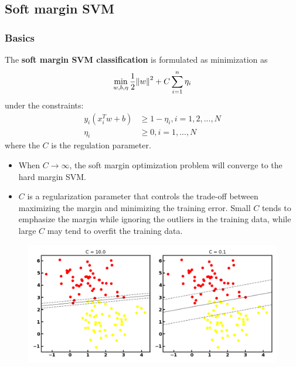 \begin{refsection}
\subsection{Soft margin SVM}
\subsubsection{Basics}
\begin{definition}
	The \textbf{soft margin SVM classification} is formulated as minimization as
	$$\min_{w,b,\eta} \frac{1}{2}\norm{w}^2 + C\sum_{i=1}^n \eta_i$$
	under the constraints:
	\begin{align*}
	y_i(x_i^Tw + b) &\geq 1 - \eta_i,i=1,2,...,N\\
	\eta_i &\geq 0, i=1,...,N
	\end{align*}
	where the $C$ is the regulation parameter.  
\end{definition}

\begin{remark}\hfill
	\begin{itemize}
		\item When $C\to \infty$, the soft margin optimization problem will converge to the hard margin SVM.
		\item $C$ is a regularization parameter that controls the trade-off between maximizing the margin and minimizing the training error. Small $C$ tends to emphasize the margin while ignoring the outliers in the training data, while large $C$ may tend to overfit the training data.
	\end{itemize}	
\end{remark}



\begin{figure}[H]
	\centering
	\includegraphics[width=0.7\linewidth]{../figures/statisticalLearning/linearModelClassification/softSVMClassificationExample}
	\caption{}
	\label{fig:softsvmclassificationexample}
\end{figure}






\end{refsection}
